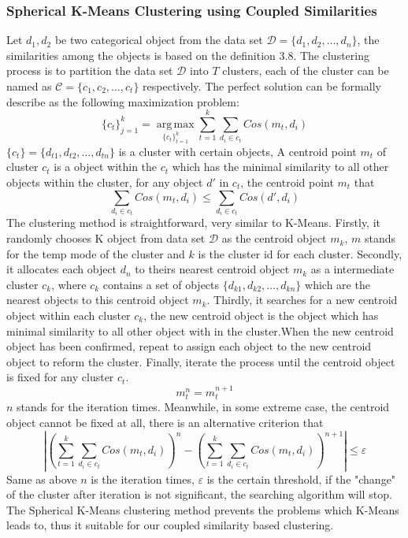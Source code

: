 \documentclass{article}
\numberwithin{equation}{section}
\begin{document}
\subsubsection{Spherical K-Means Clustering using Coupled Similarities}
Let $d_{1},d_{2}$ be two categorical object from the data set $\mathcal{D}=\{d_{1},d_{2},\ldots,d_{n}\}$, the similarities among the objects is based on the definition 3.8. The clustering process is to partition the data set $\mathcal{D}$ into $T$ clusters, each of the cluster can be named as $\mathcal{C}=\{c_{1},c_{2},\ldots,c_{t}\}$ respectively. The perfect solution can be formally describe as the following maximization problem:
\begin{equation}
 \{c_{t}\}^{k}_{j=1}=\underset{\{c_{t}\}^{k}_{t=1}}{\operatorname{arg\,max}}\sum^{k}_{t=1}\sum_{d_{i}\in{c_t}}Cos(m_{t},d_{i})
 \end{equation}
 $\{c_{t}\}=\{d_{t1},d_{t2},\ldots,d_{tn}\}$ is a cluster with certain objects, A centroid point $m_{t}$ of cluster ${c_{t}}$ is a object within the $c_{t}$ which has the minimal similarity to all other objects within the cluster, for any object $d'$ in ${c_{t}}$, the centroid point $m_{t}$ that
  \begin{equation}
   \sum_{d_{i}\in{c_{t}}}Cos(m_{t},d_{i})\leq\sum_{d_{i}\in{c_{t}}}Cos(d',d_{i})
 \end{equation}
  The clustering method is straightforward, very similar to K-Means. Firstly, it randomly chooses K object from data set $\mathcal{D}$ as the centroid object ${m_{k}}$, $m$ stands for the temp mode of the cluster and $k$ is the cluster id for each cluster. Secondly, it allocates each object ${d_{n}}$ to theirs nearest centroid object ${m_{k}}$ as a intermediate cluster $c_{k}$, where $c_{k}$ contains a set of objects $\{d_{k1},d_{k2},\ldots,d_{kn}\}$ which are the nearest objects to this centroid object ${m_{k}}$. Thirdly, it searches for a new centroid object within each cluster $c_{k}$, the new centroid object is the object which has minimal similarity to all other object with in the cluster.When the new centroid object has been confirmed, repeat to assign each object to the new centroid object to reform the cluster. Finally, iterate the process until the centroid object is fixed for any cluster $c_{t}$.
     \begin{equation}
   m^{n}_{t}=m^{n+1}_{t}
 \end{equation}
 $n$ stands for the iteration times. Meanwhile, in some extreme case, the centroid object cannot be fixed at all, there is an alternative criterion that
       \begin{equation}
   |(\sum^{k}_{t=1}\sum_{d_{i}\in{c_t}}Cos(m_{t},d_{i}))^{n}- (\sum^{k}_{t=1}\sum_{d_{i}\in{c_t}}Cos(m_{t},d_{i}))^{n+1}|\leq\varepsilon
 \end{equation}
 Same as above $n$ is the iteration times, $\varepsilon$ is the certain threshold, if the "change" of the cluster after iteration is not significant, the searching algorithm will stop.
   The Spherical K-Means clustering method prevents the problems which K-Means leads to, thus it suitable for our coupled similarity based clustering.
\end{document}
